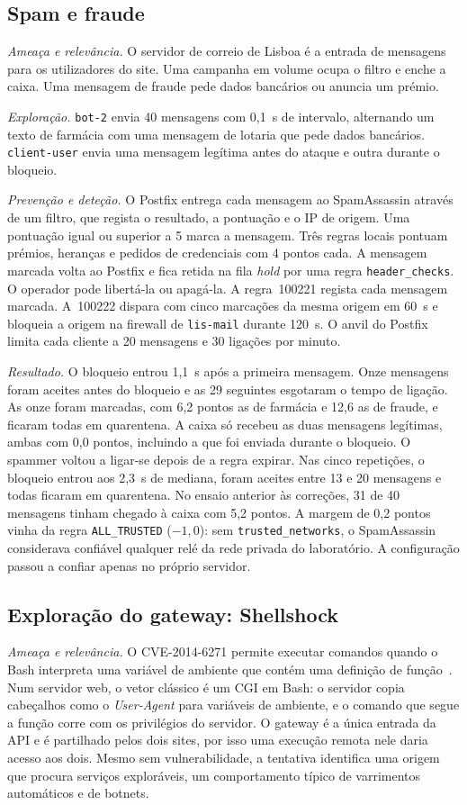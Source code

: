 \documentclass[conference,a4paper]{IEEEtran}
\newcommand{\code}[1]{\texttt{\small #1}}
\begin{document}
\subsection{Spam e fraude}
\emph{Ameaça e relevância.} O servidor de correio de Lisboa é a entrada de mensagens para os utilizadores do site. Uma campanha em volume ocupa o filtro e enche a caixa. Uma mensagem de fraude pede dados bancários ou anuncia um prémio.

\emph{Exploração.} \code{bot-2} envia 40 mensagens com 0,1~s de intervalo, alternando um texto de farmácia com uma mensagem de lotaria que pede dados bancários. \code{client-user} envia uma mensagem legítima antes do ataque e outra durante o bloqueio.

\emph{Prevenção e deteção.} O Postfix entrega cada mensagem ao SpamAssassin através de um filtro, que regista o resultado, a pontuação e o IP de origem. Uma pontuação igual ou superior a 5 marca a mensagem. Três regras locais pontuam prémios, heranças e pedidos de credenciais com 4 pontos cada. A mensagem marcada volta ao Postfix e fica retida na fila \emph{hold} por uma regra \code{header\_checks}. O operador pode libertá-la ou apagá-la. A regra~100221 regista cada mensagem marcada. A~100222 dispara com cinco marcações da mesma origem em 60~s e bloqueia a origem na firewall de \code{lis-mail} durante 120~s. O anvil do Postfix limita cada cliente a 20 mensagens e 30 ligações por minuto.

\emph{Resultado.} O bloqueio entrou 1,1~s após a primeira mensagem. Onze mensagens foram aceites antes do bloqueio e as 29 seguintes esgotaram o tempo de ligação. As onze foram marcadas, com 6,2 pontos as de farmácia e 12,6 as de fraude, e ficaram todas em quarentena. A caixa só recebeu as duas mensagens legítimas, ambas com 0,0 pontos, incluindo a que foi enviada durante o bloqueio. O spammer voltou a ligar-se depois de a regra expirar. Nas cinco repetições, o bloqueio entrou aos 2,3~s de mediana, foram aceites entre 13 e 20 mensagens e todas ficaram em quarentena. No ensaio anterior às correções, 31 de 40 mensagens tinham chegado à caixa com 5,2 pontos. A margem de 0,2 pontos vinha da regra \code{ALL\_TRUSTED} ($-1{,}0$): sem \code{trusted\_networks}, o SpamAssassin considerava confiável qualquer relé da rede privada do laboratório. A configuração passou a confiar apenas no próprio servidor.

\subsection{Exploração do gateway: Shellshock}
\emph{Ameaça e relevância.} O CVE-2014-6271 permite executar comandos quando o Bash interpreta uma variável de ambiente que contém uma definição de função~\cite{cve}. Num servidor web, o vetor clássico é um CGI em Bash: o servidor copia cabeçalhos como o \emph{User-Agent} para variáveis de ambiente, e o comando que segue a função corre com os privilégios do servidor. O gateway é a única entrada da API e é partilhado pelos dois sites, por isso uma execução remota nele daria acesso aos dois. Mesmo sem vulnerabilidade, a tentativa identifica uma origem que procura serviços exploráveis, um comportamento típico de varrimentos automáticos e de botnets.
\end{document}

